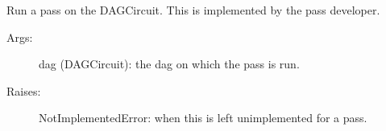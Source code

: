 \documentclass[letterpaper,10pt,english]{sphinxmanual}
\begin{document}
\begin{fulllineitems}
\begin{fulllineitems}
\label{\detokenize{Base:BaseFaultTolerance.FaultTolerance.run}}
Run a pass on the DAGCircuit. This is implemented by the pass developer.
\begin{description}
\item[{Args:}] \leavevmode
dag (DAGCircuit): the dag on which the pass is run.

\item[{Raises:}] \leavevmode
NotImplementedError: when this is left unimplemented for a pass.

\end{description}

\end{fulllineitems}


\end{fulllineitems}

\end{document}
